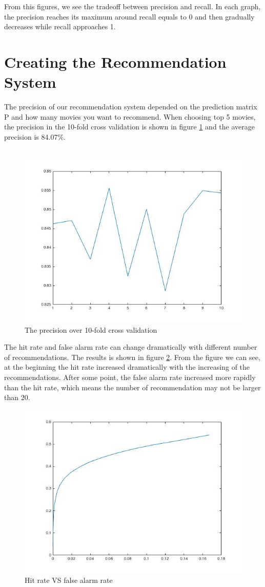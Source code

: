 \documentclass{article}
\begin{document}
From this figures, we see the tradeoff between precision and recall. In each graph, the precision reaches its maximum around recall equals to 0 and then gradually decreases while recall approaches 1.


\section{Creating the Recommendation System}
The precision of our recommendation system depended on the prediction matrix P and how many movies you want to recommend. When choosing top 5 movies, the precision in the 10-fold cross validation is shown in figure \ref{fig:p5} and the average precision is 84.07\%.\\
\\
\begin{figure}[htbp]
\centering
\includegraphics[width=.6\textwidth]{precision_5.jpg}
\caption{The precision over 10-fold cross validation}
\label{fig:p5}
\end{figure}
The hit rate and false alarm rate can change dramatically with different number of recommendations. The results is shown in figure \ref{fig:hit}. From the figure we can see, at the beginning the hit rate increased dramatically with the increasing of the recommendations. After some point, the false alarm rate increased more rapidly than the hit rate, which means the number of recommendation may not be larger than 20.
\begin{figure}[htbp]
\centering
\includegraphics[width=.6\textwidth]{hit_false_20.jpg}
\caption{Hit rate VS false alarm rate}
\label{fig:hit}
\end{figure}
\end{document}
